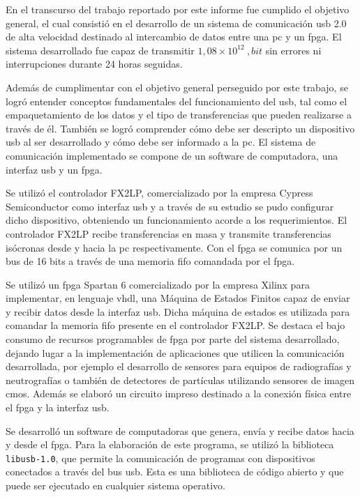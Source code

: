 En el transcurso del trabajo reportado por este informe fue cumplido el objetivo general, el cual consistió en el desarrollo de un sistema de comunicación \acrshort{usb} 2.0 de alta velocidad destinado al intercambio de datos entre una \acrshort{pc} y un \acrshort{fpga}. El sistema desarrollado fue capaz de transmitir $1,08 \times 10^{12} \ ,bit$ sin errores ni interrupciones durante 24 horas seguidas.

Además de cumplimentar con el objetivo general perseguido por este trabajo, se logró entender conceptos fundamentales del funcionamiento del \acrshort{usb}, tal como el empaquetamiento de los datos y el tipo de transferencias que pueden realizarse a través de él. También se logró comprender cómo debe ser descripto un dispositivo \acrshort{usb} al ser desarrollado y cómo debe ser informado a la \acrshort{pc}. El sistema de comunicación implementado se compone de un software de computadora, una interfaz \acrshort{usb} y un \acrshort{fpga}.

Se utilizó el controlador FX2LP, comercializado por la empresa Cypress Semiconductor como interfaz \acrshort{usb} y a través de su estudio se pudo configurar dicho dispositivo, obteniendo un funcionamiento acorde a los requerimientos. El controlador FX2LP recibe transferencias en masa y transmite transferencias isócronas desde y hacia la \acrshort{pc} respectivamente. Con el \acrshort{fpga} se comunica por un bus de 16 bits a través de una memoria \acrshort{fifo} comandada por el \acrshort{fpga}.

Se utilizó un \acrshort{fpga} Spartan 6 comercializado por la empresa Xilinx para implementar, en lenguaje \acrshort{vhdl}, una Máquina de Estados Finitos capaz de enviar y recibir datos desde la interfaz \acrshort{usb}. Dicha máquina de estados es utilizada para comandar la memoria \acrshort{fifo} presente en el controlador FX2LP. Se destaca el bajo consumo de recursos programables de \acrshort{fpga} por parte del sistema desarrollado, dejando lugar a la implementación de aplicaciones que utilicen la comunicación desarrollada, por ejemplo el desarrollo de sensores para equipos de radiografías y neutrografías o también de detectores de partículas utilizando sensores de imagen \acrshort{cmos}. Además se elaboró un circuito impreso destinado a la conexión física entre el \acrshort{fpga} y la interfaz \acrshort{usb}.

Se desarrolló un software de computadoras que genera, envía y recibe datos hacia y desde el \acrshort{fpga}. Para la elaboración de este programa, se utilizó la biblioteca \verb|libusb-1.0|, que permite la comunicación de programas con dispositivos conectados a través del bus \acrshort{usb}. Esta es una biblioteca de código abierto y que puede ser ejecutado en cualquier sistema operativo.

